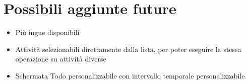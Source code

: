 \documentclass[]{article}
\providecommand{\tightlist}{%
  \setlength{\itemsep}{0pt}\setlength{\parskip}{0pt}}
\begin{document}
\hypertarget{possibili-aggiunte-future}{%
\section{Possibili aggiunte future}\label{possibili-aggiunte-future}}

\begin{itemize}
\tightlist
\item
  Più ingue disponibili
\item
  Attività selezionabili direttamente dalla lista, per poter eseguire la
  stessa operazione su attività diverse
\item
  Schermata Todo personalizzabile con intervallo temporale
  personalizzabile
\end{itemize}
\end{document}

